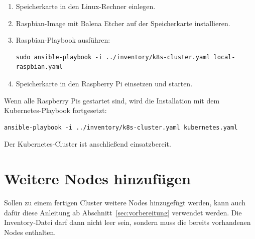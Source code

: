 \begin{enumerate}
    \item Speicherkarte in den Linux-Rechner einlegen.
    \item Raspbian-Image mit Balena Etcher auf der Speicherkarte installieren.
    \item Raspbian-Playbook ausführen:
        \begin{lstlisting}
sudo ansible-playbook -i ../inventory/k8s-cluster.yaml local-raspbian.yaml
\end{lstlisting}
    \item Speicherkarte in den Raspberry Pi einsetzen und starten.
\end{enumerate}

Wenn alle Raspberry Pis gestartet sind, wird die Installation mit dem Kubernetes-Playbook fortgesetzt:

\begin{lstlisting}
ansible-playbook -i ../inventory/k8s-cluster.yaml kubernetes.yaml
\end{lstlisting}

Der Kubernetes-Cluster ist anschließend einsatzbereit.

\section{Weitere Nodes hinzufügen}\label{sec:weitere-nodes-hinzufügen}

Sollen zu einem fertigen Cluster weitere Nodes hinzugefügt werden, kann auch dafür diese Anleitung ab Abschnitt~\ref{sec:vorbereitung} verwendet werden.
Die Inventory-Datei darf dann nicht leer sein, sondern muss die bereits vorhandenen Nodes enthalten.

